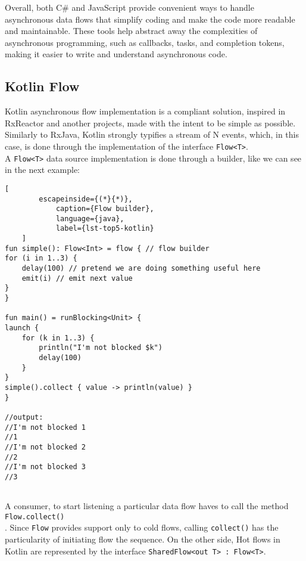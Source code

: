 Overall, both C\# and JavaScript provide convenient ways to handle asynchronous data flows that simplify coding and make the code more readable and maintainable. These tools help abstract away the complexities of asynchronous programming, such as callbacks, tasks, and completion tokens, making it easier to write and understand asynchronous code.

\subsection{Kotlin Flow}
\label{sec:kotlinflow}
Kotlin asynchronous flow implementation is a \cite{ReactiveStreams} compliant solution, inspired in RxReactor and another projects, made with the intent to be simple as possible. Similarly to RxJava, Kotlin strongly typifies a stream of N events, which, in this case, is done through the implementation of the interface \texttt{Flow<T>}.\\
A \texttt{Flow<T>} data source implementation is done through a builder, like we can see in the next example:


\begin{center}
	\lstset{basicstyle=\scriptsize\ttfamily,frame=bottomline}
	\begin{lstlisting}[
		escapeinside={(*}{*)},
			caption={Flow builder},
			language={java},
			label={lst-top5-kotlin}
	]
fun simple(): Flow<Int> = flow { // flow builder
for (i in 1..3) {
	delay(100) // pretend we are doing something useful here
	emit(i) // emit next value
}
}

fun main() = runBlocking<Unit> {
launch {
	for (k in 1..3) {
		println("I'm not blocked $k")
		delay(100)
	}
}
simple().collect { value -> println(value) } 
}

//output:
//I'm not blocked 1
//1
//I'm not blocked 2
//2
//I'm not blocked 3
//3
	
	\end{lstlisting}
\end{center}


A consumer, to start listening a particular data flow haves to call the method \texttt{Flow.collect()}\\. Since \texttt{Flow} provides support only to cold flows, calling \texttt{collect()} has the particularity of initiating flow the sequence.
On the other side, Hot flows in Kotlin are represented by the interface \texttt{SharedFlow<out T> : Flow<T>}. 

